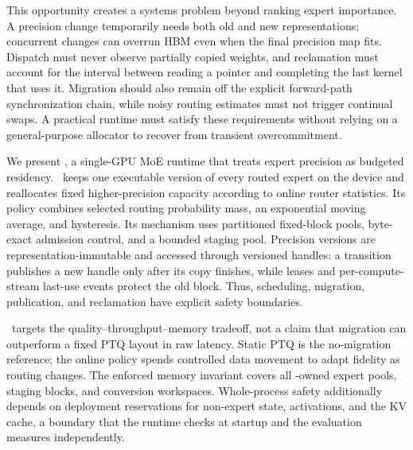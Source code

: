 This opportunity creates a systems problem beyond ranking expert importance. A precision change temporarily needs both old and new representations; concurrent changes can overrun HBM even when the final precision map fits. Dispatch must never observe partially copied weights, and reclamation must account for the interval between reading a pointer and completing the last kernel that uses it. Migration should also remain off the explicit forward-path synchronization chain, while noisy routing estimates must not trigger continual swaps. A practical runtime must satisfy these requirements without relying on a general-purpose allocator to recover from transient overcommitment.

We present \systemname, a single-GPU MoE runtime that treats expert precision as budgeted residency. \systemname\ keeps one executable version of every routed expert on the device and reallocates fixed higher-precision capacity according to online router statistics. Its policy combines selected routing probability mass, an exponential moving average, and hysteresis. Its mechanism uses partitioned fixed-block pools, byte-exact admission control, and a bounded staging pool. Precision versions are representation-immutable and accessed through versioned handles: a transition publishes a new handle only after its copy finishes, while leases and per-compute-stream last-use events protect the old block. Thus, scheduling, migration, publication, and reclamation have explicit safety boundaries.

\systemname\ targets the quality--throughput--memory tradeoff, not a claim that migration can outperform a fixed PTQ layout in raw latency. Static PTQ is the no-migration reference; the online policy spends controlled data movement to adapt fidelity as routing changes. The enforced memory invariant covers all \systemname-owned expert pools, staging blocks, and conversion workspaces. Whole-process safety additionally depends on deployment reservations for non-expert state, activations, and the KV cache, a boundary that the runtime checks at startup and the evaluation measures independently.

